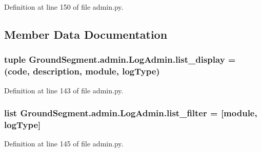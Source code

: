 Definition at line 150 of file admin.\+py.



\subsection{Member Data Documentation}
\hypertarget{class_ground_segment_1_1admin_1_1_log_admin_ac8c7525189a7e9e57965075df5ec45c7}{}
\subsubsection[{list\+\_\+display}]{\setlength{\rightskip}{0pt plus 5cm}tuple Ground\+Segment.\+admin.\+Log\+Admin.\+list\+\_\+display = (\textquotesingle{}code\textquotesingle{}, \textquotesingle{}description\textquotesingle{}, \textquotesingle{}module\textquotesingle{}, \textquotesingle{}log\+Type\textquotesingle{})\hspace{0.3cm}{\ttfamily [static]}}\label{class_ground_segment_1_1admin_1_1_log_admin_ac8c7525189a7e9e57965075df5ec45c7}


Definition at line 143 of file admin.\+py.

\hypertarget{class_ground_segment_1_1admin_1_1_log_admin_af2b67dae38be5b38e45f557981df1d60}{}
\subsubsection[{list\+\_\+filter}]{\setlength{\rightskip}{0pt plus 5cm}list Ground\+Segment.\+admin.\+Log\+Admin.\+list\+\_\+filter = \mbox{[}\textquotesingle{}module\textquotesingle{}, \textquotesingle{}log\+Type\textquotesingle{}\mbox{]}\hspace{0.3cm}{\ttfamily [static]}}\label{class_ground_segment_1_1admin_1_1_log_admin_af2b67dae38be5b38e45f557981df1d60}


Definition at line 145 of file admin.\+py.

\hypertarget{class_ground_segment_1_1admin_1_1_log_admin_ab30bff8bf9257f4f38a07a1a0cb2f708}{}
